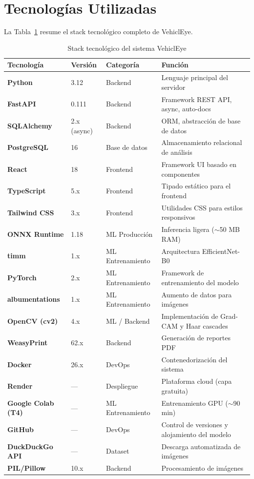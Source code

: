 \documentclass[12pt,a4paper]{article}
\begin{document}
\section{Tecnologías Utilizadas}

La Tabla~\ref{tab:tecnologias} resume el stack tecnológico completo de VehiclEye.

\begin{table}[H]
\centering
\caption{Stack tecnológico del sistema VehiclEye}
\label{tab:tecnologias}
\small
\begin{tabularx}{\linewidth}{>{\bfseries}l l l X}
\toprule
\textbf{Tecnología} & \textbf{Versión} & \textbf{Categoría} & \textbf{Función} \\
\midrule
Python & 3.12 & Backend & Lenguaje principal del servidor \\
FastAPI & 0.111 & Backend & Framework REST API, async, auto-docs \\
SQLAlchemy & 2.x (async) & Backend & ORM, abstracción de base de datos \\
PostgreSQL & 16 & Base de datos & Almacenamiento relacional de análisis \\
React & 18 & Frontend & Framework UI basado en componentes \\
TypeScript & 5.x & Frontend & Tipado estático para el frontend \\
Tailwind CSS & 3.x & Frontend & Utilidades CSS para estilos responsivos \\
ONNX Runtime & 1.18 & ML Producción & Inferencia ligera ($\sim$50 MB RAM) \\
timm & 1.x & ML Entrenamiento & Arquitectura EfficientNet-B0 \\
PyTorch & 2.x & ML Entrenamiento & Framework de entrenamiento del modelo \\
albumentations & 1.x & ML Entrenamiento & Aumento de datos para imágenes \\
OpenCV (cv2) & 4.x & ML / Backend & Implementación de Grad-CAM y Haar cascades \\
WeasyPrint & 62.x & Backend & Generación de reportes PDF \\
Docker & 26.x & DevOps & Contenedorización del sistema \\
Render & --- & Despliegue & Plataforma cloud (capa gratuita) \\
Google Colab (T4) & --- & ML Entrenamiento & Entrenamiento GPU ($\sim$90 min) \\
GitHub & --- & DevOps & Control de versiones y alojamiento del modelo \\
DuckDuckGo API & --- & Dataset & Descarga automatizada de imágenes \\
PIL/Pillow & 10.x & Backend & Procesamiento de imágenes \\
\bottomrule
\end{tabularx}
\end{table}
\end{document}
